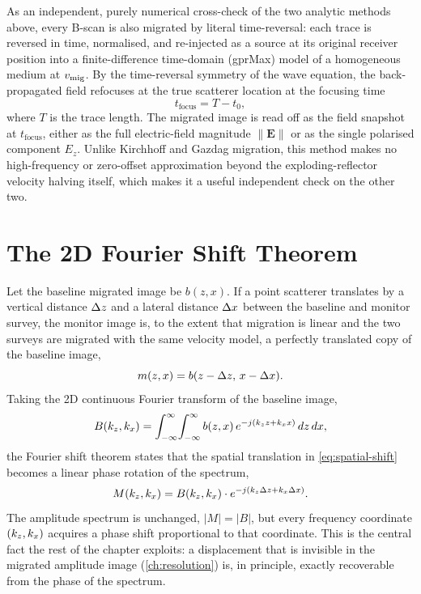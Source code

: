 As an independent, purely numerical cross-check of the two analytic methods
above, every B-scan is also migrated by literal time-reversal: each trace is
reversed in time, normalised, and re-injected as a source at its original
receiver position into a finite-difference time-domain (gprMax) model of a
homogeneous medium at $v_{\mathrm{mig}}$. By the time-reversal symmetry of the wave
equation, the back-propagated field refocuses at the true scatterer location
at the focusing time
\begin{equation}
  t_{\mathrm{focus}} = T - t_0 ,
  \label{eq:backprop-focus}
\end{equation}
where $T$ is the trace length. The migrated image is read off as the field
snapshot at $t_{\mathrm{focus}}$, either as the full electric-field magnitude
$\lVert\mathbf{E}\rVert$ or as the single polarised component $E_z$. Unlike
Kirchhoff and Gazdag migration, this method makes no high-frequency or
zero-offset approximation beyond the exploding-reflector velocity halving
itself, which makes it a useful independent check on the other two.

\section{The 2D Fourier Shift Theorem}
\label{sec:th-fourier-shift}

Let the baseline migrated image be $b(z,x)$. If a point scatterer
translates by a vertical distance $\Delta z$ and a lateral distance $\Delta x$ between
the baseline and monitor survey, the monitor image is, to the extent that
migration is linear and the two surveys are migrated with the same velocity
model, a perfectly translated copy of the baseline image,
\begin{equation}
  m(z,x) = b(z - \Delta z,\, x - \Delta x).
  \label{eq:spatial-shift}
\end{equation}
Taking the 2D continuous Fourier transform of the baseline image,
\begin{equation}
  B(k_z,k_x) = \int_{-\infty}^{\infty}\!\int_{-\infty}^{\infty}
    b(z,x)\, e^{-j(k_z z + k_x x)}\, dz\, dx,
  \label{eq:2d-fourier}
\end{equation}
the Fourier shift theorem states that the spatial translation in
\cref{eq:spatial-shift} becomes a linear phase rotation of the spectrum,
\begin{equation}
  M(k_z,k_x) = B(k_z,k_x)\cdot e^{-j(k_z \Delta z + k_x \Delta x)}.
  \label{eq:fourier-shift-theorem}
\end{equation}
The amplitude spectrum is unchanged, $|M|=|B|$, but every frequency
coordinate $(k_z,k_x)$ acquires a phase shift proportional to that
coordinate. This is the central fact the rest of the chapter exploits: a
displacement that is invisible in the migrated amplitude image
(\cref{ch:resolution}) is, in principle, exactly recoverable from the phase of
the spectrum.


